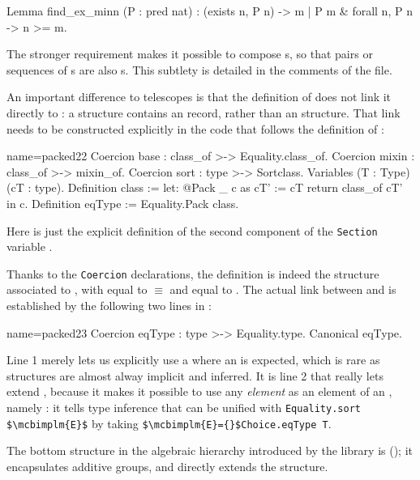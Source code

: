 \begin{coq}{}{}
Lemma find_ex_minn (P : pred nat)  :
  (exists n, P n) -> {m | P m & forall n, P n -> n >= m}.
\end{coq}
The stronger requirement
makes it possible to compose s, so that pairs or
sequences of s are also s.  This subtlety
is detailed in the comments of the  file.

An important difference to telescopes is that the definition of
 does not link it directly to : a
 structure contains an  record, rather
than an  structure. That link needs to be constructed
explicitly in the code that follows the definition of :

\begin{coq}{name=packed22}{}
Coercion base : class_of >-> Equality.class_of.
Coercion mixin : class_of >-> mixin_of.
Coercion sort : type >-> Sortclass.
Variables (T : Type) (cT : type).
Definition class := let: @Pack _ c as cT' := cT return class_of cT' in c.
Definition eqType := Equality.Pack class.
\end{coq}

Here  is just the explicit definition of the second component
of the \lstinline/Section/ variable . 

Thanks to the \lstinline/Coercion/ declarations, the  definition is
indeed the  structure associated to , with 
equal to ${}\equiv{}$ and  equal to .
The actual link between  and  is established
by the following two lines in :

\begin{coq}{name=packed23}{}
Coercion eqType : type >-> Equality.type.
Canonical eqType.
\end{coq}

Line 1 merely lets us explicitly use a  where an
 is expected, which is rare as structures are almost alway
implicit and inferred.  It is line 2 that really lets 
extend , because it makes it possible to use any
\emph{element}  as an element of an ,
namely : it tells type inference that 
can be unified with \lstinline/Equality.sort $\mcbimplm{E}$/ by taking
\lstinline/$\mcbimplm{E}={}$Choice.eqType T/.

The bottom structure in the \mcbMC{} algebraic hierarchy introduced by
the  library is  (); it
encapsulates additive groups, and directly extends the 
structure.

